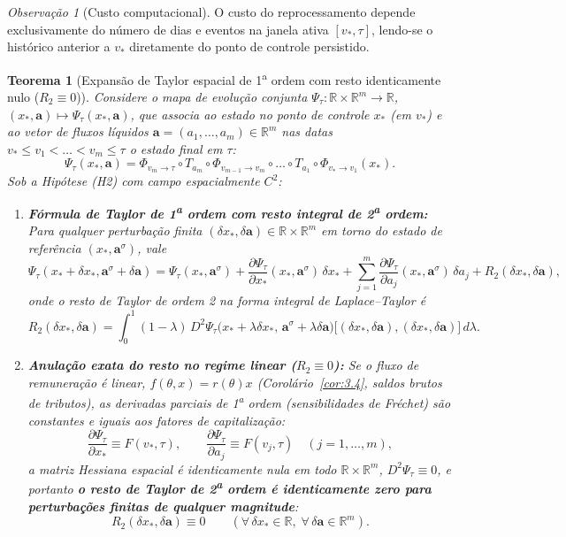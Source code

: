 \documentclass[11pt, a4paper]{article}
\theoremstyle{definition}
\theoremstyle{plain}
\newtheorem{teorema}[definicao]{Teorema}
\theoremstyle{remark}
\newtheorem{observacao}[definicao]{Observação}
\begin{document}
\begin{observacao}[Custo computacional]\label{obs:4.4}
O custo do reprocessamento depende exclusivamente do número de dias e eventos na janela ativa $[v_*, \tau]$, lendo-se o histórico anterior a $v_*$ diretamente do ponto de controle persistido.
\end{observacao}

\begin{teorema}[Expansão de Taylor espacial de 1\textsuperscript{a} ordem com resto identicamente nulo ($R_2 \equiv 0$)]\label{teo:4.5}
Considere o mapa de evolução conjunta $\Psi_\tau : \mathbb{R} \times \mathbb{R}^m \to \mathbb{R}$, $(x_*, \mathbf{a}) \mapsto \Psi_\tau(x_*, \mathbf{a})$, que associa ao estado no ponto de controle $x_*$ (em $v_*$) e ao vetor de fluxos líquidos $\mathbf{a} = (a_1, \dots, a_m) \in \mathbb{R}^m$ nas datas $v_* \le v_1 < \dots < v_m \le \tau$ o estado final em $\tau$:
\[
\Psi_\tau(x_*, \mathbf{a}) = \Phi_{v_m \to \tau} \circ T_{a_m} \circ \Phi_{v_{m-1} \to v_m} \circ \dots \circ T_{a_1} \circ \Phi_{v_* \to v_1}(x_*).
\]
Sob a Hipótese (H2) com campo espacialmente $C^2$:
\begin{enumerate}[label=(\roman*)]
    \item \textbf{Fórmula de Taylor de 1\textsuperscript{a} ordem com resto integral de 2\textsuperscript{a} ordem:} Para qualquer perturbação finita $(\delta x_*, \delta\mathbf{a}) \in \mathbb{R} \times \mathbb{R}^m$ em torno do estado de referência $(x_*, \mathbf{a}^\sigma)$, vale
    \[
    \Psi_\tau(x_* + \delta x_*, \mathbf{a}^\sigma + \delta\mathbf{a}) = \Psi_\tau(x_*, \mathbf{a}^\sigma) + \frac{\partial \Psi_\tau}{\partial x_*}(x_*, \mathbf{a}^\sigma)\,\delta x_* + \sum_{j=1}^{m} \frac{\partial \Psi_\tau}{\partial a_j}(x_*, \mathbf{a}^\sigma)\,\delta a_j + R_2(\delta x_*, \delta\mathbf{a}),
    \]
    onde o resto de Taylor de ordem 2 na forma integral de Laplace--Taylor é
    \[
    R_2(\delta x_*, \delta\mathbf{a}) = \int_0^1 (1 - \lambda)\, D^2 \Psi_\tau\big(x_* + \lambda\delta x_*,\, \mathbf{a}^\sigma + \lambda\delta\mathbf{a}\big)\big[(\delta x_*, \delta\mathbf{a}), (\delta x_*, \delta\mathbf{a})\big]\,d\lambda.
    \]
    \item \textbf{Anulação exata do resto no regime linear ($R_2 \equiv 0$):} Se o fluxo de remuneração é linear, $f(\theta, x) = r(\theta)x$ (Corolário~\ref{cor:3.4}, saldos brutos de tributos), as derivadas parciais de 1\textsuperscript{a} ordem (sensibilidades de Fréchet) são constantes e iguais aos fatores de capitalização:
    \[
    \frac{\partial \Psi_\tau}{\partial x_*} \equiv F(v_*, \tau), \qquad \frac{\partial \Psi_\tau}{\partial a_j} \equiv F(v_j, \tau) \quad (j = 1, \dots, m),
    \]
    a matriz Hessiana espacial é identicamente nula em todo $\mathbb{R} \times \mathbb{R}^m$, $D^2 \Psi_\tau \equiv 0$, e portanto \textbf{o resto de Taylor de 2\textsuperscript{a} ordem é identicamente zero para perturbações finitas de qualquer magnitude}:
    \[
    R_2(\delta x_*, \delta\mathbf{a}) \equiv 0 \qquad (\forall\, \delta x_* \in \mathbb{R},\; \forall\, \delta\mathbf{a} \in \mathbb{R}^m).
    \]
\end{enumerate}
\end{teorema}
\end{document}
